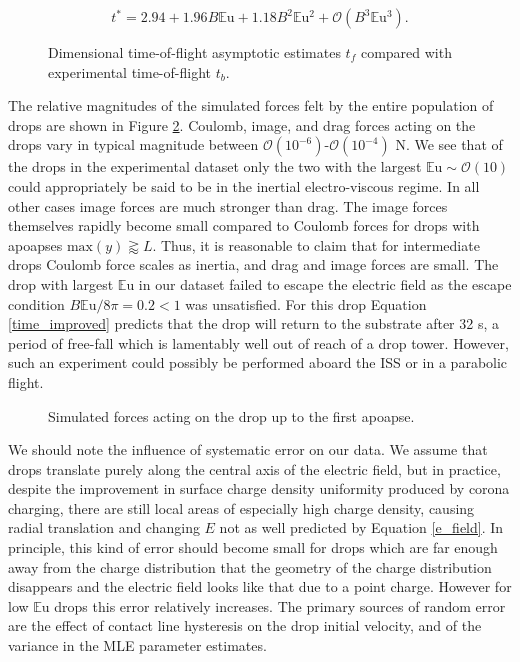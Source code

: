 \documentclass[12pt,a4paper,oneside]{book}
\begin{document}
\begin{equation}
\label{time_improved}
t^* = 2.94 + 1.96B\mathbb{E}\mbox{u} + 1.18B^2\mathbb{E}\mbox{u}^{2} + \mathcal{O}(B^3\mathbb{E}\mbox{u}^{3}).
\end{equation}
\begin{figure}[htb]
    \centering
    
    \caption{Dimensional time-of-flight asymptotic estimates $t_f$ compared with experimental time-of-flight $t_b$.\label{fig:series_s_ds}}
\end{figure}

The relative magnitudes of the simulated forces felt by the entire population of drops are shown in Figure \ref{fig:forces}. Coulomb, image, and drag forces acting on the drops vary in typical magnitude between $\mathcal{O}(10^{-6})$-$\mathcal{O}(10^{-4})$ N. We see that of the drops in the experimental dataset only the two with the largest $\mathbb{E}\mbox{u} \sim \mathcal{O}(10)$ could appropriately be said to be in the inertial electro-viscous regime. In all other cases image forces are much stronger than drag. The image forces themselves rapidly become small compared to Coulomb forces for drops with apoapses $\mbox{max}\left( y\right) \gtrapprox L$. Thus, it is reasonable to claim that for intermediate drops Coulomb force scales as inertia, and drag and image forces are small. The drop with largest $\mathbb{E}\mbox{u}$ in our dataset failed to escape the electric field as the escape condition $B \mathbb{E}\mbox{u} / 8\pi = 0.2 < 1$ was unsatisfied. For this drop Equation \ref{time_improved} predicts that the drop will return to the substrate after 32 s, a period of free-fall which is lamentably well out of reach of a drop tower. However, such an experiment could possibly be performed aboard the ISS or in a parabolic flight.
\begin{figure}[!htb]
    \centering
    \resizebox{14cm}{!}{}
    \caption{Simulated forces acting on the drop up to the first apoapse.\label{fig:forces}}
\end{figure}  

We should note the influence of systematic error on our data. We assume that drops translate purely along the central axis of the electric field, but in practice, despite the improvement in surface charge density uniformity produced by corona charging, there are still local areas of especially high charge density, causing radial translation and changing $E$ not as well predicted by Equation \ref{e_field}.  In principle, this kind of error should become small for drops which are far enough away from the charge distribution that the geometry of the charge distribution disappears and the electric field looks like that due to a point charge. However for low $\mathbb{E}\mbox{u}$ drops this error relatively increases. The primary sources of random error are the effect of contact line hysteresis on the drop initial velocity, and of the variance in the MLE parameter estimates.
\end{document}
